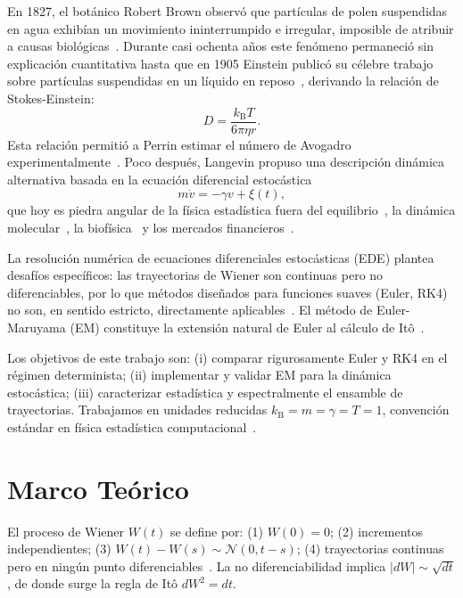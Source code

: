 \documentclass[aps,prl,twocolumn,showpacs,superscriptaddress,longbibliography]{revtex4-2}
\newcommand{\kB}{k_{\mathrm{B}}}
\begin{document}
	En 1827, el botánico Robert Brown observó que partículas de polen
	suspendidas en agua exhibían un movimiento ininterrumpido e irregular,
	imposible de atribuir a causas biológicas~\cite{Brown1828}.
	Durante casi ochenta años este fenómeno permaneció sin explicación
	cuantitativa hasta que en 1905 Einstein publicó su célebre trabajo
	sobre partículas suspendidas en un líquido en reposo~\cite{Einstein1905},
	derivando la relación de Stokes-Einstein:
	\begin{equation}
		D = \frac{\kB T}{6\pi\eta r}.
		\label{eq:stokes_einstein}
	\end{equation}
	Esta relación permitió a Perrin estimar el número de Avogadro
	experimentalmente~\cite{Perrin1909}.  Poco después, Langevin propuso
	una descripción dinámica alternativa basada en la ecuación diferencial
	estocástica~\cite{Langevin1908}
	\begin{equation}
		m\dot{v} = -\gamma v + \xi(t),
		\label{eq:langevin_intro}
	\end{equation}
	que hoy es piedra angular de la física estadística fuera del
	equilibrio~\cite{Zwanzig2001}, la dinámica molecular~\cite{Allen1987},
	la biofísica~\cite{Doi1988} y los mercados financieros~\cite{Mantegna1999}.
	
	La resolución numérica de ecuaciones diferenciales estocásticas
	(EDE) plantea desafíos específicos: las trayectorias de Wiener son
	continuas pero no diferenciables, por lo que métodos diseñados para
	funciones suaves (Euler, RK4) no son, en sentido estricto, directamente
	aplicables~\cite{Kloeden1992}.  El método de Euler-Maruyama (EM)
	constituye la extensión natural de Euler al cálculo de Itô~\cite{Maruyama1955}.
	
	Los objetivos de este trabajo son: (i) comparar rigurosamente Euler y
	RK4 en el régimen determinista; (ii) implementar y validar EM para la
	dinámica estocástica; (iii) caracterizar estadística y espectralmente
	el ensamble de trayectorias.  Trabajamos en unidades reducidas
	$\kB{=}m{=}\gamma{=}T{=}1$, convención estándar en física estadística
	computacional~\cite{Allen1987}.
	
	\section{Marco Teórico}
	\label{sec:teoria}
	
	El proceso de Wiener $W(t)$ se define por:
	(1) $W(0)=0$;
	(2) incrementos independientes;
	(3) $W(t)-W(s)\sim\mathcal{N}(0,t-s)$;
	(4) trayectorias continuas pero en ningún punto diferenciables~\cite{Gardiner2009}.
	La no diferenciabilidad implica $|dW|\sim\sqrt{dt}$, de donde surge la
	regla de Itô $dW^2 = dt$.
	
\end{document}
